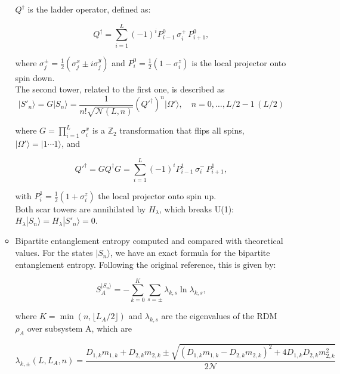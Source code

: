 \documentclass[11pt]{article}
\begin{document}
\begin{itemize}
\begin{itemize}
	 $Q^\dagger$ is 	the ladder operator, defined as:
	
	\begin{equation}
	Q^\dagger = \sum_{i = 1}^{L} (-1)^i P^0_{i-1} \, \sigma^+_i \, P^0_{i+1}, 
	\end{equation}
	
	where $\sigma_j^\pm = \frac{1}{2} (\sigma_j^x \pm i \sigma_j^y)$ and $P^0_i = \frac{1}{2} (1 - \sigma^z_i)$ is the local projector onto spin down.\\
        The second tower, related to the first one, is described as 
        \begin{equation}
	|S'_n\rangle = G |S_n\rangle = \frac{1}{n! \sqrt{\mathcal{N}(L, n)}} \left(Q'^\dagger\right)^n |\Omega'\rangle, \quad n = 0,\hdots,L/2 - 1 \, (L/2)
	\end{equation}
	
	\noindent where $G = \prod_{i=1}^L \sigma_i^x$ is a $\mathbb{Z}_2$ transformation that flips all spins, 
	$|\Omega'\rangle = |1 \cdots 1\rangle$, and
	
	\begin{equation}
	Q'^\dagger = G Q^\dagger G = \sum_{i = 1}^{L} (-1)^i P^1_{i-1} \, \sigma^-_i \, P^1_{i+1},
	\end{equation}
	
	\noindent with $P^1_i = \frac{1}{2}(1 + \sigma^z_i)$ the local projector onto spin up.\\
	Both scar towers are annihilated by $H_{\lambda}$, which breaks U(1): $H_{\lambda} |S_n\rangle = H_{\lambda} |S'_n\rangle = 0$.
        \item Bipartite entanglement entropy computed and compared with theoretical values.
        For the states $|S_n\rangle$, we have an exact formula for the bipartite entanglement entropy. Following the original reference, this is given by:
        
        \begin{equation}\label{aaa1}
        S^{|S_n\rangle }_A = - \sum_{k=0}^{K} \sum_{s=\pm} \lambda_{k,s} \ln \lambda_{k,s},
        \end{equation}
        
        where $K =\min{\left(n, \lfloor L_A/2 \rfloor\right)}$ and $\lambda_{k,s}$ are the eigenvalues of the RDM $\rho_A$ over subsystem A, which are 
        
        \begin{equation}\label{bbb1a}
        \lambda_{k,\pm} \left( L, L_A, n\right) = \frac{D_{1,k}m_{1,k} + D_{2,k}m_{2,k} \pm \sqrt{\left(D_{1,k}m_{1,k} - D_{2,k}m_{2,k}\right)^2 + 4 D_{1,k}D_{2,k}m^2_{2,k}}}{2\mathcal{N}}
        \end{equation}
        

\end{itemize}
\end{itemize}
\end{document}
